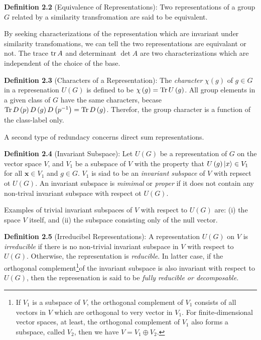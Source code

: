 \textbf{Definition 2.2} (Equivalence of Representations): Two representations of a group $G$ related by a similarity transfromation are said to be equivalent.

By seeking characterizations of the representation which are invariant under similarity transfomations, we can tell the two representations are equivalant or not.
The trace $\tr A$ and determinant $\det A$ are two characterizations which are independent of the choice of the base.

\textbf{Definition 2.3} (Characters of a Representation): The \textit{character} $\chi \left( g \right)$ of $g \in G$ in a represenation $U \left( G \right)$ is defined to be $\chi \left( g \right) = \Tr U \left( g \right)$.
All group elements in a given class of $G$ have the same characters, becase $\Tr D \left( p \right) D \left( g \right) D \left( p^{-1} \right)= \Tr D \left( g \right)$.
Therefor, the group character is a function of the class-label only.

A second type of redundacy concerns direct sum representations.

\textbf{Definition 2.4} (Invariant Subspace): Let $U \left( G \right)$ be a representation of $G$ on the vector space $V$, and $V_{1}$ be a subspace of $V$ with the property that $U \left( g \right) \ket{x} \in V_{1}$ for all $\mathbf{x} \in V_{1}$ and $g \in G$.
$V_{1}$ is siad to be an \textit{invariant subspace} of $V$ with repsect ot $U \left( G \right)$.
An invariant subspace is \textit{mimimal} or \textit{proper} if it does not contain any non-trival invariant subspace with respect ot $U \left( G \right)$.

Examples of trivial invariant subspaces of $V$ with respect to $U \left( G \right)$ are: (i) the space $V$ itself, and (ii) the subspace consisting only of the null vector.

\textbf{Definition 2.5} (Irreducibel Representations): A representation $U \left( G \right)$ on $V$ is \textit{irreducible} if there is no non-trivial invariant subspace in $V$ with respect to $U \left( G \right)$.
Otherwise, the representation is \textit{reducible}.
In latter case, if the orthogonal complement\footnote{If $V_{1}$ is a subspace of $V$, the orthogonal complement of $V_{1}$ consists of all vectors in $V$ which are orthogonal to very vector in $V_{1}$. For finite-dimensional vector spaces, at least, the orthogonal complement of $V_{1}$ also forms a subspace, called $V_{2}$, then we have $V = V_1 \oplus V_2$.}of the invariant subspace is also invariant with respect to $U \left( G \right)$, then the represenation is said to be \textit{fully reducible or decomposable.}

